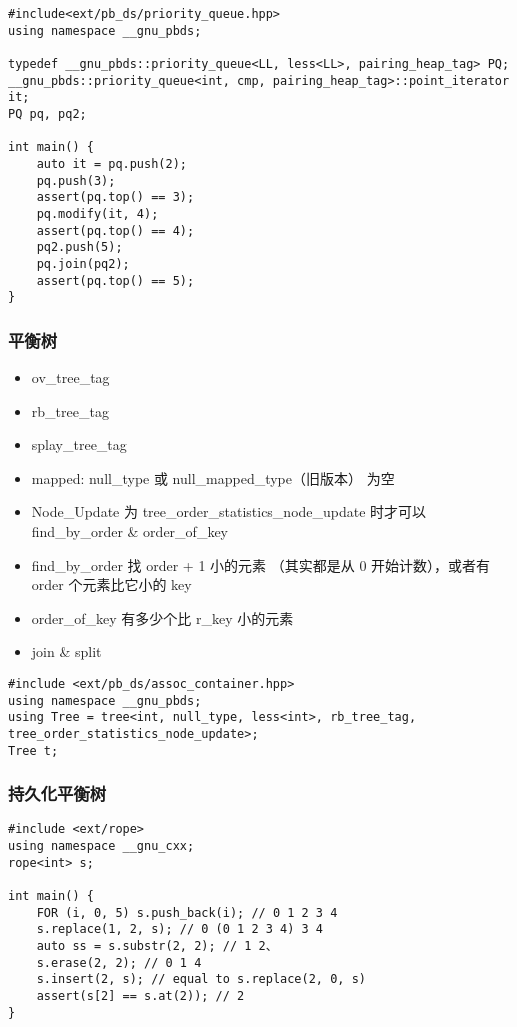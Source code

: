 \documentclass[]{article}
\begin{document}
\begin{verbatim}
#include<ext/pb_ds/priority_queue.hpp>
using namespace __gnu_pbds;

typedef __gnu_pbds::priority_queue<LL, less<LL>, pairing_heap_tag> PQ;
__gnu_pbds::priority_queue<int, cmp, pairing_heap_tag>::point_iterator it;
PQ pq, pq2;

int main() {
    auto it = pq.push(2);
    pq.push(3);
    assert(pq.top() == 3);
    pq.modify(it, 4);
    assert(pq.top() == 4);
    pq2.push(5);
    pq.join(pq2);
    assert(pq.top() == 5);
}
\end{verbatim}

\hypertarget{ux5e73ux8861ux6811}{%
\subsubsection{平衡树}\label{ux5e73ux8861ux6811}}

\begin{itemize}
\item
  ov\_tree\_tag
\item
  rb\_tree\_tag
\item
  splay\_tree\_tag
\item
  mapped: null\_type 或 null\_mapped\_type（旧版本） 为空
\item
  Node\_Update 为 tree\_order\_statistics\_node\_update 时才可以
  find\_by\_order \& order\_of\_key
\item
  find\_by\_order 找 order + 1 小的元素 （其实都是从 0
  开始计数），或者有 order 个元素比它小的 key
\item
  order\_of\_key 有多少个比 r\_key 小的元素
\item
  join \& split
\end{itemize}

\begin{verbatim}
#include <ext/pb_ds/assoc_container.hpp>
using namespace __gnu_pbds;
using Tree = tree<int, null_type, less<int>, rb_tree_tag, tree_order_statistics_node_update>;
Tree t;
\end{verbatim}

\hypertarget{ux6301ux4e45ux5316ux5e73ux8861ux6811}{%
\subsubsection{持久化平衡树}\label{ux6301ux4e45ux5316ux5e73ux8861ux6811}}

\begin{verbatim}
#include <ext/rope>
using namespace __gnu_cxx;
rope<int> s;

int main() {
    FOR (i, 0, 5) s.push_back(i); // 0 1 2 3 4
    s.replace(1, 2, s); // 0 (0 1 2 3 4) 3 4
    auto ss = s.substr(2, 2); // 1 2、
    s.erase(2, 2); // 0 1 4
    s.insert(2, s); // equal to s.replace(2, 0, s)
    assert(s[2] == s.at(2)); // 2
}
\end{verbatim}
\end{document}
